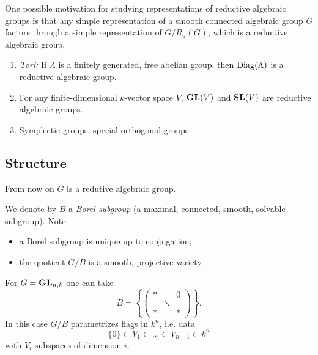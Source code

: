 One possible motivation for studying representations of reductive algebraic groups is that any simple representation of a smooth connected algebraic group $G$ factors through a simple representation of $G /R_u(G)$, which is a reductive algebraic group.

\begin{example}
	\begin{enumerate}[(1)]
		\item \emph{Tori:} If $\Lambda$ is a finitely generated, free abelian group, then $\operatorname{Diag}(\Lambda)$ is a reductive algebraic group.
		\item For any finite-dimensional $k$-vector space $V$, $\mathbf{GL}(V)$ and $\mathbf{SL}(V)$ are reductive algebraic groups.
		\item Symplectic groups, special orthogonal groups.
	\end{enumerate}
\end{example}
\subsection{Structure} From now on $G$ is a redutive algebraic group.

We denote by $B$ a \emph{Borel subgroup} (a maximal, connected, smooth, solvable subgroup). Note:
\begin{itemize}
	\item a Borel subgroup is unique up to conjugation;
	\item the quotient $G /B$ is a smooth, projective variety.
\end{itemize}
\begin{example}
	 For $G=\mathbf{GL}_{n,k}$ one can take
	 \[
		 B = \left\{ \begin{pmatrix} * & & 0 \\ & \ddots & \\ * & & *\end{pmatrix}  \right\} .
	 \] 
	 In this case $G /B$ parametrizes flags in $k^{n}$, i.e. data
	 \[
	  \{0\} \subset V_1\subset \dots\subset V_{n-1}\subset k^{n}
	 \]
	 with $V_i$ subspaces of dimension $i$.
\end{example}


